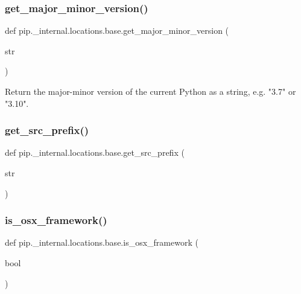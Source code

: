 \subsubsection{\texorpdfstring{get\+\_\+major\+\_\+minor\+\_\+version()}{get\_major\_minor\_version()}}
{\footnotesize\ttfamily def pip.\+\_\+internal.\+locations.\+base.\+get\+\_\+major\+\_\+minor\+\_\+version (\begin{DoxyParamCaption}\item[{}]{str }\end{DoxyParamCaption})}

\begin{DoxyVerb}Return the major-minor version of the current Python as a string, e.g.
"3.7" or "3.10".
\end{DoxyVerb}
 \mbox{\label{namespacepip_1_1__internal_1_1locations_1_1base_abb29fd9aa24b893e2dccf200aa6ea99b}} 
\subsubsection{\texorpdfstring{get\+\_\+src\+\_\+prefix()}{get\_src\_prefix()}}
{\footnotesize\ttfamily def pip.\+\_\+internal.\+locations.\+base.\+get\+\_\+src\+\_\+prefix (\begin{DoxyParamCaption}\item[{}]{str }\end{DoxyParamCaption})}

\mbox{\label{namespacepip_1_1__internal_1_1locations_1_1base_aecc2c54fff1431c62a51f93ed4684d31}} 
\subsubsection{\texorpdfstring{is\+\_\+osx\+\_\+framework()}{is\_osx\_framework()}}
{\footnotesize\ttfamily def pip.\+\_\+internal.\+locations.\+base.\+is\+\_\+osx\+\_\+framework (\begin{DoxyParamCaption}\item[{}]{bool }\end{DoxyParamCaption})}



